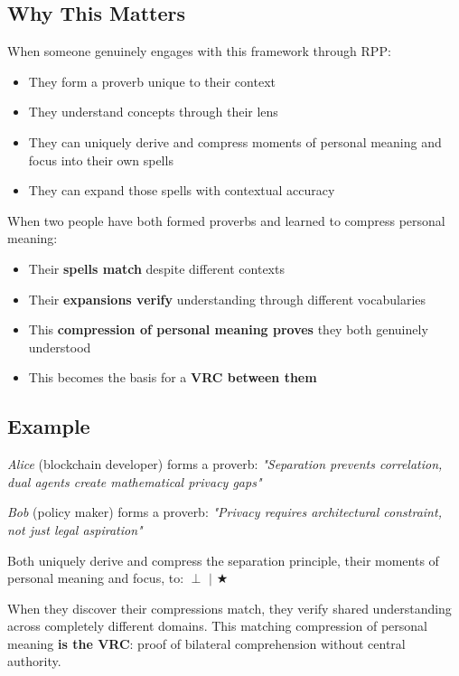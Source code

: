 \documentclass[11pt,a4paper]{article}
\theoremstyle{definition}
\begin{document}
\subsection{Why This Matters}

When someone genuinely engages with this framework through RPP:

\begin{itemize}
    \item They form a proverb unique to their context
    \item They understand concepts through their lens
    \item They can uniquely derive and compress moments of personal meaning and focus into their own spells
    \item They can expand those spells with contextual accuracy
\end{itemize}

When two people have both formed proverbs and learned to compress personal meaning:

\begin{itemize}
    \item Their \textbf{spells match} despite different contexts
    \item Their \textbf{expansions verify} understanding through different vocabularies
    \item This \textbf{compression of personal meaning proves} they both genuinely understood
    \item This becomes the basis for a \textbf{VRC between them}
\end{itemize}

\subsection{Example}

\textit{Alice} (blockchain developer) forms a proverb: \textit{"Separation prevents correlation, dual agents create mathematical privacy gaps"}

\textit{Bob} (policy maker) forms a proverb: \textit{"Privacy requires architectural constraint, not just legal aspiration"}

Both uniquely derive and compress the separation principle, their moments of personal meaning and focus, to: $\perp$ $|$ $\bigstar$

When they discover their compressions match, they verify shared understanding across completely different domains. This matching compression of personal meaning \textbf{is the VRC}: proof of bilateral comprehension without central authority.
\end{document}
